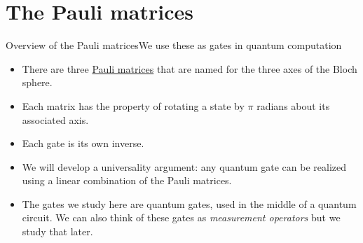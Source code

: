 
\section{The Pauli matrices}

\begin{frame}{Overview of the Pauli matrices}{We use these as gates in quantum computation}

\begin{itemize}
    \item There are three \href{https://en.wikipedia.org/wiki/Pauli_matrices}{Pauli matrices} that are named for the three axes of the Bloch sphere.
    \item Each matrix has the property of rotating a state by $\pi$ radians about its associated axis.
    \item Each gate is its own inverse.
    \item We will develop a universality argument:  any quantum gate can be realized using a linear combination of the Pauli matrices.
    \item The gates we study here are quantum gates, used in the middle of a quantum circuit.  We can also think of these gates as \emph{measurement operators} but we study that later.
\end{itemize}
    
\end{frame}


